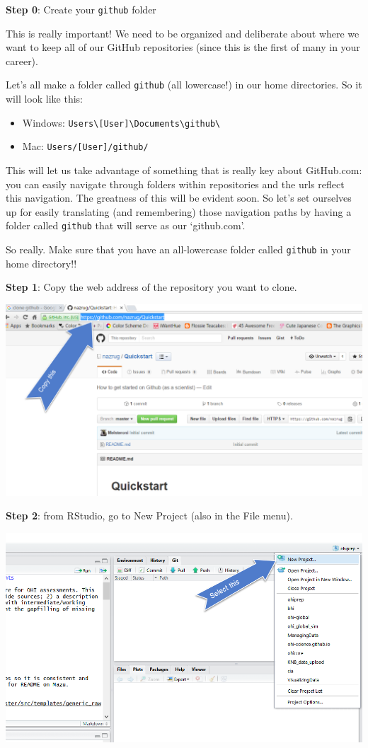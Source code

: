 \documentclass[]{book}
\providecommand{\tightlist}{%
  \setlength{\itemsep}{0pt}\setlength{\parskip}{0pt}}
\begin{document}
\textbf{Step 0}: Create your \texttt{github} folder

This is really important! We need to be organized and deliberate about where we want to keep all of our GitHub repositories (since this is the first of many in your career).

Let's all make a folder called \texttt{github} (all lowercase!) in our home directories. So it will look like this:

\begin{itemize}
\tightlist
\item
  Windows: \texttt{Users\textbackslash{}{[}User{]}\textbackslash{}Documents\textbackslash{}github\textbackslash{}}
\item
  Mac: \texttt{Users/{[}User{]}/github/}
\end{itemize}

This will let us take advantage of something that is really key about GitHub.com: you can easily navigate through folders within repositories and the urls reflect this navigation. The greatness of this will be evident soon. So let's set ourselves up for easily translating (and remembering) those navigation paths by having a folder called \texttt{github} that will serve as our `github.com'.

So really. Make sure that you have an all-lowercase folder called \texttt{github} in your home directory!!

\textbf{Step 1}: Copy the web address of the repository you want to clone.

\includegraphics{img/clone_step1.png}

\textbf{Step 2}: from RStudio, go to New Project (also in the File menu).

\includegraphics{img/new_project_1.png}
\end{document}
